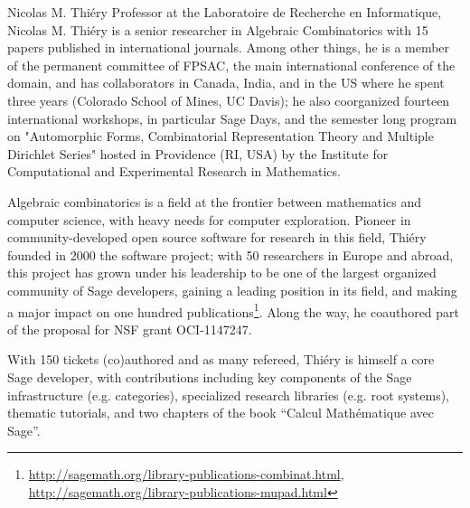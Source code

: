 \begin{participant}[PM=12,salary=7500]{Nicolas M. Thiéry}
  Professor at the Laboratoire de Recherche en Informatique, Nicolas M. Thiéry is a senior
  researcher in Algebraic Combinatorics with 15 papers published in international
  journals. Among other things, he is a member of the permanent committee of FPSAC, the
  main international conference of the domain, and has collaborators in Canada, India, and
  in the US where he spent three years (Colorado School of Mines, UC Davis); he also
  coorganized fourteen international workshops, in particular Sage Days, and the semester
  long program on "Automorphic Forms, Combinatorial Representation Theory and Multiple
  Dirichlet Series" hosted in Providence (RI, USA) by the Institute for Computational and
  Experimental Research in Mathematics.

  Algebraic combinatorics is a field at the frontier between mathematics and computer
  science, with heavy needs for computer exploration. Pioneer in community-developed open
  source software for research in this field, Thiéry founded in 2000 the \SageCombinat
  software project; with 50 researchers in Europe and abroad, this project has grown under
  his leadership to be one of the largest organized community of Sage developers, gaining
  a leading position in its field, and making a major impact on one hundred
  publications\footnote{\url{http://sagemath.org/library-publications-combinat.html},
    \url{http://sagemath.org/library-publications-mupad.html}}. Along the way,
  he coauthored part of the proposal for NSF \SageCombinat grant OCI-1147247.

  With 150 tickets (co)authored and as many refereed, Thiéry is himself a core Sage
  developer, with contributions including key components of the Sage infrastructure
  (e.g. categories), specialized research libraries (e.g. root systems), thematic
  tutorials, and two chapters of the book ``Calcul Mathématique avec Sage''.
\end{participant}
